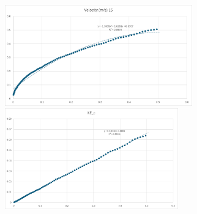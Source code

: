 \documentclass[12pt,a4paper]{article}
\begin{document}
\begin{figure}[!h]
    \includegraphics[height=4.36cm]{W9vel.png}
    \includegraphics[height=4.36cm]{W9KEc.png}
    \caption{\label{table2}}
\end{figure}
\end{document}

